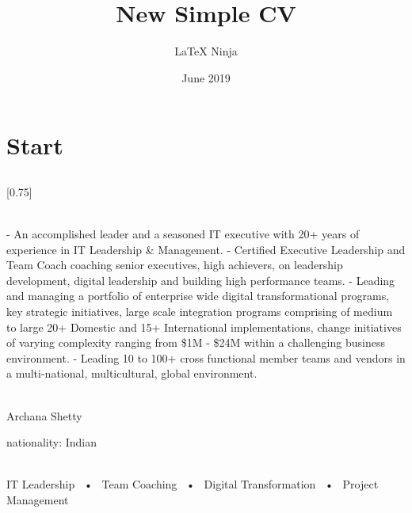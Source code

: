 \documentclass[lighthipster]{simplehipstercv}
\title{New Simple CV}
\author{\LaTeX{} Ninja}
\date{June 2019}
\begin{document}
\thispagestyle{empty}

\section*{Start}


\subsection*{}
\vspace{4em}

\setlength{\columnsep}{1.5cm}
[0.75]
\begin{paracol}{2}

\paracolbackgroundoptions

\footnotesize
{\setasidefontcolour
\flushright
\begin{center}
\end{center}

\\[0.5em]

{\footnotesize
- An accomplished leader and a seasoned IT executive with 20+ years of experience in IT Leadership \& Management.
- Certified Executive Leadership and Team Coach coaching senior executives, high achievers, on leadership development, digital leadership and building high performance teams.
- Leading and managing a portfolio of enterprise wide digital transformational programs, key strategic initiatives, large scale integration programs comprising of medium to large 20+ Domestic and 15+ International implementations, change initiatives of varying complexity ranging from \$1M - \$24M within a challenging business environment.
- Leading 10 to 100+ cross functional member teams and vendors in a multi-national, multicultural, global environment.}
\bigskip

 \\[0.5em]
Archana Shetty

nationality: Indian 

\bigskip

 \\[0.5em]

IT Leadership ~•~ Team Coaching ~•~ Digital Transformation ~•~ Project Management

\bigskip

}
\end{paracol}
\end{document}
